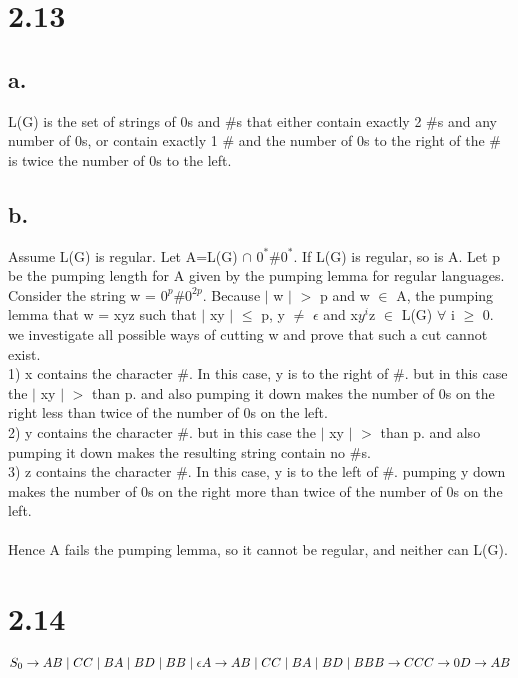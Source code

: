\documentclass{scrartcl}
\begin{document}
\section*{2.13}
\subsection*{a.}
L(G) is the set of strings of 0s and \#s that either contain exactly 2 \#s and any number of 0s, or contain exactly 1 \# and the number of 0s to the right of the \# is twice the number of 0s to the left.

 
\subsection*{b.}
Assume L(G) is regular. Let A=L(G) $\cap$ $0^*$\#$0^*$. If L(G) is regular, so is A. Let p be the pumping length for A given by the pumping lemma for regular languages. Consider the string w = $0^p$\#$0^{2p}$. Because $\mid$ w $\mid$ $>$ p and w $\in$ A, the pumping lemma that w = xyz such that $\mid$ xy $\mid$ $\leq$ p, y $\neq$ $\epsilon$ and x${y^i}$z $\in$ L(G) $\forall$ i $\geq$ 0. we investigate all possible ways of cutting w and prove that such a cut cannot exist.\\

1) x contains the character \#. In this case, y is to the right of \#. but in this case the $\mid$ xy $\mid$ $>$ than p. and also pumping it down makes the number of 0s on the right less than twice of the number of 0s on the left.\\

2) y contains the character \#. but in this case the $\mid$ xy $\mid$ $>$ than p. and also pumping it down makes the resulting string contain no \#s.\\
3) z contains the character \#. In this case, y is to the left of \#. pumping y down makes the number of 0s on the right more than twice of the number of 0s on the left.\\
\\
Hence A fails the pumping lemma, so it cannot be regular, and neither can L(G).

\section*{2.14}
$S_0 \rightarrow AB\mid CC \mid BA \mid BD \mid BB \mid \epsilon\\
A \rightarrow AB \mid CC \mid BA \mid BD \mid BB \\
B \rightarrow CC\\
C \rightarrow 0\\
D \rightarrow AB$
\end{document}
